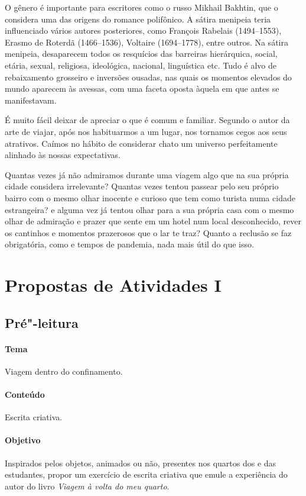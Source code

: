 \documentclass[12pt]{extarticle}
\begin{document}
O gênero é importante para escritores como o russo Mikhail Bakhtin, que o considera uma das origens do romance polifônico.  A sátira menipeia teria influenciado vários autores posteriores, como 
François Rabelais (1494--1553), 
Erasmo de Roterdã (1466--1536), 
Voltaire (1694--1778), entre outros.
Na sátira menipeia, desaparecem todos os resquícios das barreiras hierárquica, social, etária, sexual, religiosa, ideológica, nacional, linguística etc. Tudo é alvo de rebaixamento grosseiro e inversões ousadas, nas quais os momentos elevados do mundo aparecem às avessas, com uma faceta oposta àquela em que antes se manifestavam.

É muito fácil deixar de apreciar o que é comum e familiar. Segundo o autor da arte de viajar, após nos habituarmos a um lugar, nos tornamos cegos aos seus atrativos. Caímos no hábito de considerar chato um universo perfeitamente alinhado às nossas expectativas.

Quantas vezes já não admiramos durante uma viagem algo que na sua própria cidade considera irrelevante? Quantas vezes tentou passear pelo seu próprio bairro com o mesmo olhar inocente e curioso que tem como turista numa cidade estrangeira? e alguma vez já tentou olhar para a sua própria casa com o mesmo olhar de admiração e prazer que sente em um hotel num local desconhecido, rever os cantinhos e momentos prazerosos que o lar te traz? Quanto a reclusão se faz obrigatória, como e tempos de pandemia, nada mais útil do que isso. 



\section{Propostas de Atividades I}


\subsection{Pré"-leitura}


\paragraph{Tema} Viagem dentro do confinamento. 

\paragraph{Conteúdo} Escrita criativa. 

\paragraph{Objetivo} Inspirados pelos objetos, animados ou não, 
presentes nos quartos dos e das estudantes, propor um exercício 
de escrita criativa que emule a experiência do autor do livro
\textit{Viagem à volta do meu quarto}.
\end{document}
